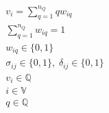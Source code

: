 \begin{subequations}
\begin{align}
    v_i = \sum_{q=1}^{n_Q} qw_{iq}                                               \label{subeq:wmax}           \\
    \sum_{q=1}^{n_Q} w_{iq} = 1                                                 \label{subeq:wone}           \\
    w_{iq} \in \{0,1\}                                                      \label{subeq:wspace}         \\
    \sigma_{ij} \in \{0,1\},\;\delta_{ij} \in \{0,1\}\;                     \label{subeq:ssdspace}        \\
    v_i \in  \mathbb{Q}                                                    \label{subeq:vvspace}        \\
    i \in \mathbb{V}                                                        \label{subeq:vispace}         \\
    q \in \mathbb{Q} 							   \label{subeq:qspace}
\end{align}
\end{subequations}
